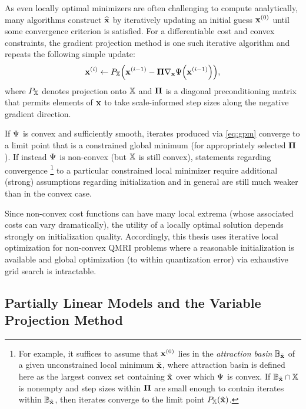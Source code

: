 As even locally optimal minimizers
are often challenging to compute analytically,
many algorithms construct $\widehat{\mathbf{x}}$ 
by iteratively updating
an initial guess $\bmxi{0}$
until some convergence criterion is satisfied.
For a differentiable cost
and convex constraints, 
the gradient projection method
\cite{rosen:60:tgp}
is one such iterative algorithm
and repeats the following simple update:
\begin{align}
	\bmxi{i} \gets \proja{\setX}{\bmxi{i-1}-\bmPi \grada{\bmx}\costa{\bmxi{i-1}}},
	\label{eq:gpm}
\end{align}
where $P_{\mathbb{X}}$ denotes 
projection onto $\mathbb{X}$
and $\boldsymbol{\Pi}$ is a diagonal preconditioning matrix
that permits elements of $\mathbf{x}$
to take scale-informed step sizes
along the negative gradient direction.

If $\Psi$ is convex and sufficiently smooth,
iterates produced via \eqref{eq:gpm} 
converge to a limit point \cite{byrne:04:aut}
that is a constrained global minimum
(for appropriately selected $\boldsymbol{\Pi}$).
If instead $\Psi$ is non-convex 
(but $\mathbb{X}$ is still convex),
statements regarding convergence
\footnote{For example, 
it suffices to assume
that $\bmxi{0}$ lies
in the \emph{attraction basin} $\mathbb{B}_{\tilde{\mathbf{x}}}$
of a given unconstrained local minimum $\tilde{\mathbf{x}}$, 
where attraction basin 
is defined here as the largest convex set
containing $\tilde{\mathbf{x}}$ 
over which $\Psi$ is convex.
If $\mathbb{B}_{\tilde{\mathbf{x}}} \cap \mathbb{X}$ is nonempty 
and step sizes within $\boldsymbol{\Pi}$ are small enough 
to contain iterates
within $\mathbb{B}_{\tilde{\mathbf{x}}}$,
then iterates converge
to the limit point $\proja{\setX}{\bmxt}$.
}
to a particular constrained local minimizer
require additional (strong) assumptions
regarding initialization
and in general 
are still much weaker 
than in the convex case.

Since non-convex cost functions
can have many local extrema
(whose associated costs can vary dramatically),
the utility of a locally optimal solution
depends strongly on initialization quality.
Accordingly,
this thesis uses iterative local optimization
for non-convex QMRI problems
where a reasonable initialization is available
and global optimization (to within quantization error) 
via exhaustive grid search
is intractable.

\subsection{Partially Linear Models and the Variable Projection Method}
\label{ss,bkgrd,opt,vpm}


